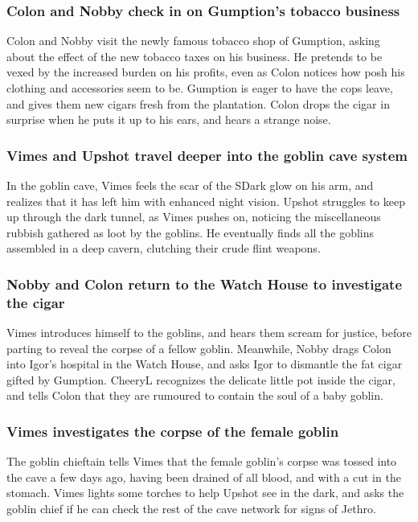 \subsubsection{\Gls{Colon} and \Gls{Nobby} check in on \Gls{Gumption}'s tobacco business}
\Gls{Colon} and \Gls{Nobby} visit the newly famous tobacco shop of \Gls{Gumption}, asking about the
effect of the new tobacco taxes on his business. He pretends to be vexed by the increased burden on
his profits, even as \Gls{Colon} notices how posh his clothing and accessories seem to be.
\Gls{Gumption} is eager to have the cops leave, and gives them new cigars fresh from the plantation.
\Gls{Colon} drops the cigar in surprise when he puts it up to his ears, and hears a strange noise.

\subsubsection{\Gls{Vimes} and \Gls{Upshot} travel deeper into the goblin cave system}
In the goblin cave, \Gls{Vimes} feels the scar of the \Gls{SDark} glow on his arm, and realizes that
it has left him with enhanced night vision. \Gls{Upshot} struggles to keep up through the dark
tunnel, as \Gls{Vimes} pushes on, noticing the miscellaneous rubbish gathered as loot by the
goblins. He eventually finds all the goblins assembled in a deep cavern, clutching their crude
flint weapons.

\subsubsection{\Gls{Nobby} and \Gls{Colon} return to the Watch House to investigate the cigar}
\Gls{Vimes} introduces himself to the goblins, and hears them scream for justice, before parting
to reveal the corpse of a fellow goblin. Meanwhile, \Gls{Nobby} drags \Gls{Colon} into \Gls{Igor}'s
hospital in the Watch House, and asks \Gls{Igor} to dismantle the fat cigar gifted by
\Gls{Gumption}. \Gls{CheeryL} recognizes the delicate little pot inside the cigar, and tells
\Gls{Colon} that they are rumoured to contain the soul of a baby goblin.

\subsubsection{\Gls{Vimes} investigates the corpse of the female goblin}
The goblin chieftain tells \Gls{Vimes} that the female goblin's corpse was tossed into the cave a
few days ago, having been drained of all blood, and with a cut in the stomach. \Gls{Vimes} lights
some torches to help \Gls{Upshot} see in the dark, and asks the goblin chief if he can check the
rest of the cave network for signs of \Gls{Jethro}.

